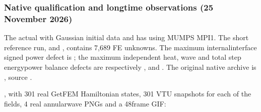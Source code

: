 \documentclass[letterpaper,10pt,english]{sphinxmanual}
\begin{document}
\subsubsection{Native qualification and long\sphinxhyphen{}time observations (25 November 2026)}
\label{\detokenize{examples/heat_wave:native-qualification-and-long-time-observations-25-november-2026}}
\sphinxAtStartPar
The actual 
with Gaussian initial data and
has  using MUMPS
MPI1. The short reference run,
 and ,
contains 7,689 FE unknowns. The
maximum internal\sphinxhyphen{}interface signed
power defect is ;
the maximum independent heat,
wave and total step energy\sphinxhyphen{}power
balance defects are respectively
, 
and .
The original native archive is
,
source .

\sphinxAtStartPar
{}, with 301 real GetFEM Hamiltonian
states, 301 VTU snapshots for each
of the  fields, 4 real
annular\sphinxhyphen{}wave PNGs and a 48\sphinxhyphen{}frame GIF:
\end{document}
